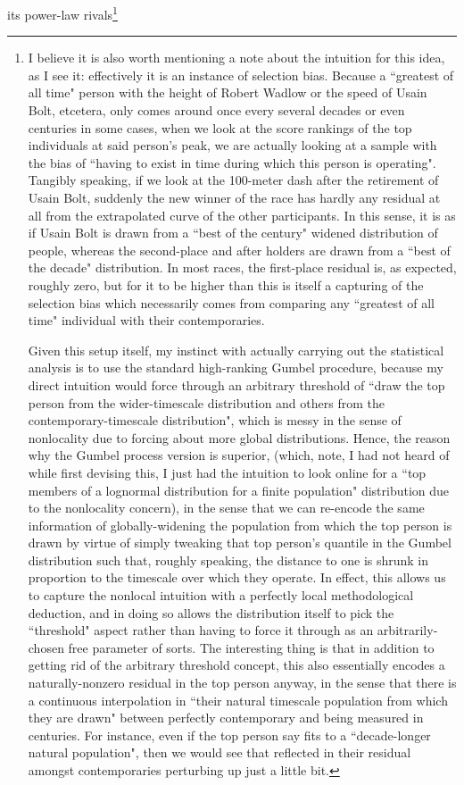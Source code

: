 \documentclass{article}
\begin{document}
its power-law rivals\footnote{
I believe it is also worth mentioning a note about the intuition for this idea, as I see it: effectively it is an instance of selection bias. Because a ``greatest of all time" person with the height of Robert Wadlow or the speed of Usain Bolt, etcetera, only comes around once every several decades or even centuries in some cases, when we look at the score rankings of the top individuals at said person's peak, we are actually looking at a sample with the bias of ``having to exist in time during which this person is operating". Tangibly speaking, if we look at the 100-meter dash after the retirement of Usain Bolt, suddenly the new winner of the race has hardly any residual at all from the extrapolated curve of the other participants. In this sense, it is as if Usain Bolt is drawn from a ``best of the century" widened distribution of people, whereas the second-place and after holders are drawn from a ``best of the decade" distribution. In most races, the first-place residual is, as expected, roughly zero, but for it to be higher than this is itself a capturing of the selection bias which necessarily comes from comparing any ``greatest of all time" individual with their contemporaries. \par
Given this setup itself, my instinct with actually carrying out the statistical analysis is to use the standard high-ranking Gumbel procedure, because my direct intuition would force through an arbitrary threshold of ``draw the top person from the wider-timescale distribution and others from the contemporary-timescale distribution", which is messy in the sense of nonlocality due to forcing about more global distributions. Hence, the reason why the Gumbel process version is superior, (which, note, I had not heard of while first devising this, I just had the intuition to look online for a ``top members of a lognormal distribution for a finite population" distribution due to the nonlocality concern), in the sense that we can re-encode the same information of globally-widening the population from which the top person is drawn by virtue of simply tweaking that top person's quantile in the Gumbel distribution such that, roughly speaking, the distance to one is shrunk in proportion to the timescale over which they operate. In effect, this allows us to capture the nonlocal intuition with a perfectly local methodological deduction, and in doing so allows the distribution itself to pick the ``threshold" aspect rather than having to force it through as an arbitrarily-chosen free parameter of sorts. 
The interesting thing is that in addition to getting rid of the arbitrary threshold concept, this also essentially encodes a naturally-nonzero residual in the top person anyway, in the sense that there is a continuous interpolation in ``their natural timescale population from which they are drawn" between perfectly contemporary and being measured in centuries. For instance, even if the top person say fits to a ``decade-longer natural population", then we would see that reflected in their residual amongst contemporaries perturbing up just a little bit. \par
}
\end{document}
